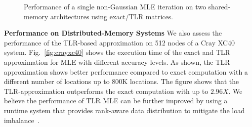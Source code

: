 \documentclass[conference]{IEEEtran}
\begin{document}
\begin{figure}
     \caption{Performance of a single non-Gaussian MLE iteration on two shared-memory  architectures using exact/TLR matrices.}
         \label{fig:tlr-exact}
\end{figure}

%

\textbf{Performance on Distributed-Memory Systems}
We also assess the performance of the TLR-based approximation
on 512 nodes of a Cray XC40 system. Fig.~\ref{fig:crayxc40} shows
the execution time of the exact and TLR approximation for MLE with different accuracy levels. As shown, the TLR 
approximation shows better performance compared to exact computation with a different number of
 locations up to 800K locations. The figure shows
 that the TLR-approximation outperforms the exact computation with up to $2.96X$.
 We believe the performance of TLR MLE can be further improved by using a runtime
 system that provides rank-aware data distribution to mitigate the load imbalance~\cite{abdulah2021accelerating}.
  
\end{document}
